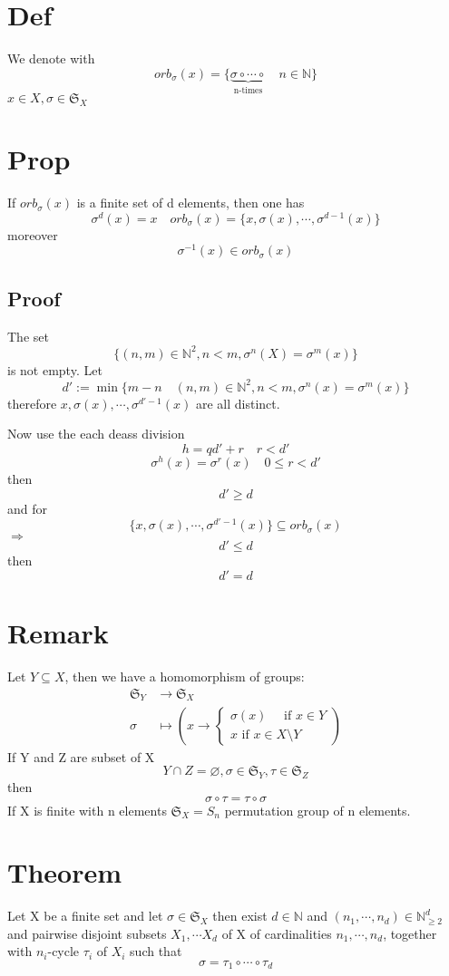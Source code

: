 \documentclass{book}
\begin{document}
\section{Def}
We denote with $$orb_\sigma(x)=\{\underbrace{\sigma\circ\cdots\circ}\limits_{\text{n-times}}\quad n\in \mathbb{N}\}$$$x\in X,\sigma\in \mathfrak{S}_X$
\section{Prop}
If $orb_\sigma(x)$ is a finite set of d elements, then one has $$\sigma^d(x)=x\quad orb_\sigma(x)=\{x,\sigma(x),\cdots,\sigma^{d-1}(x)\}$$
moreover$$\sigma^{-1}(x)\in  orb_\sigma(x)$$
\subsection{Proof}
The set $$\{(n,m)\in \mathbb{N}^2,n<m,\sigma^n(X)=\sigma^m(x)\}$$
is not empty. Let $$d':=\min\{m-n\quad(n,m)\in \mathbb{N}^2,n<m,\sigma^n(x)=\sigma^m(x)\}$$
therefore $x,\sigma(x),\cdots,\sigma^{d'-1}(x)$ are all distinct.

Now use the each deass division
$$h=qd'+r\quad r<d'$$
$$\sigma^h(x)=\sigma^r(x)\quad 0\leq r<d'$$
then $$d'\geq d$$ and for $$\{x,\sigma(x),\cdots,\sigma^{d'-1}(x)\}\subseteq orb_\sigma(x)$$$\Rightarrow$$$d'\leq d$$ then $$d'=d$$
\section{Remark}
Let $Y\subseteq X$, then we have a homomorphism of groups:
$$\begin{aligned}
    \mathfrak{S}_Y &\rightarrow\mathfrak{S}_X\\
    \sigma &\mapsto \left(x\rightarrow\left\{\begin{aligned}
        \sigma(x)\quad \text{ if } x\in Y\\ x\text{ if } x\in X\setminus Y
    \end{aligned}\right.\right)
\end{aligned}$$
If Y and Z are subset of X$$Y\cap Z=\varnothing,\sigma\in \mathfrak{S}_Y,\tau\in \mathfrak{S}_Z$$ then $$\sigma\circ\tau=\tau\circ\sigma$$
If X is finite with n elements $\mathfrak{S}_X=S_n$ permutation group of n elements.
\section{Theorem}
Let X be a finite set and let $\sigma\in \mathfrak{S}_X$ then exist $d\in \mathbb{N}$ and $(n_1,\cdots,n_d)\in \mathbb{N}_{\geq2 }^d$ and pairwise disjoint subsets $X_1,\cdots X_d$ of X of cardinalities $n_1,\cdots,n_d$, together with $n_i$-cycle $\tau_i$ of $X_i$ such that $$\sigma=\tau_1\circ\cdots\circ\tau_d$$
\end{document}
